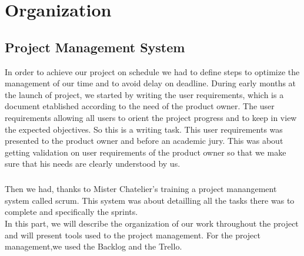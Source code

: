 \chapter{Organization}


\section{Project Management System}
In order to achieve our project on schedule we had to define steps to optimize the management of our time and to avoid delay on deadline.
During early months at the launch of project, we started by writing the user requirements, which is a document etablished according to the need of the product owner. The user requirements allowing all users to orient the project progress and to keep in view the expected objectives. So this is a writing task. This  user requirements was presented to the product owner and before an academic jury.
This was about getting validation on user requirements of the product owner so that we make sure that his needs are clearly understood by us.
\paragraph{}
Then we had, thanks to Mister Chatelier's training a project manangement system called scrum. This system was about detailling all the tasks there was to complete and specifically the sprints.
\\In this part, we will describe the organization of our work throughout the project and will  present  tools used to the  project management.
\newpage
For the project management,we used the Backlog and the Trello.
